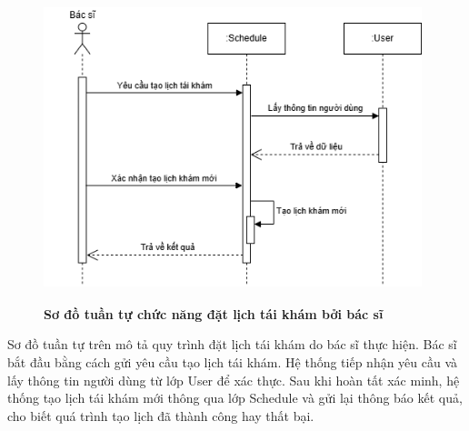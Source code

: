 \begin{figure}[H]
	\centering
	\includegraphics[width=11cm,height=9cm]{Images/sequence/schedule/createByDoctor.drawio.png}
	\caption[Sơ đồ tuần tự chức năng đặt lịch tái khám bởi bác sĩ]{\bfseries \fontsize{12pt}{0pt}
		\selectfont Sơ đồ tuần tự chức năng đặt lịch tái khám bởi bác sĩ}
	\label{sequence_create_by_doctor} %
\end{figure}
Sơ đồ tuần tự trên mô tả quy trình đặt lịch tái khám do bác sĩ thực hiện. Bác sĩ bắt đầu bằng cách gửi yêu cầu tạo lịch tái khám. Hệ thống tiếp nhận yêu cầu và lấy thông tin người dùng từ lớp User để xác thực.
Sau khi hoàn tất xác minh, hệ thống tạo lịch tái khám mới thông qua lớp Schedule và gửi lại thông báo kết quả, cho biết quá trình tạo lịch đã thành công hay thất bại.

